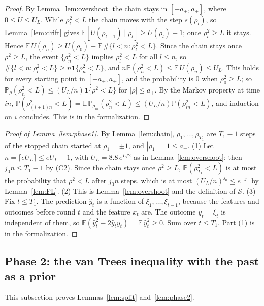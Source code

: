 \documentclass[12pt]{amsart}
\theoremstyle{definition}
\numberwithin{equation}{section}
\newcommand{\E}{\mathbb{E}}
\newcommand{\Prob}{\mathbb{P}}
\newcommand{\yh}{\hat y}
\newcommand{\Succ}{\mathcal{S}}
\begin{document}
\begin{proof}
By Lemma~\ref{lem:overshoot} the chain stays in $[-a_+,a_+]$, where $0\le U\le U_L$. While $\rho_l^2<L$ the chain moves with the step $s(\rho_l)$, so Lemma~\ref{lem:drift} gives $\E[U(\rho_{l+1})\mid\rho_l]\ge U(\rho_l)+1$; once $\rho_l^2\ge L$ it stays. Hence $\E\,U(\rho_n)\ge U(\rho_0)+\E\,\#\{l<n:\rho_l^2<L\}$. Since the chain stays once $\rho^2\ge L$, the event $\{\rho_n^2<L\}$ implies $\rho_l^2<L$ for all $l\le n$, so $\#\{l<n:\rho_l^2<L\}\ge n\mathbf 1\{\rho_n^2<L\}$, and $n\Prob(\rho_n^2<L)\le\E\,U(\rho_n)\le U_L$. This holds for every starting point in $[-a_+,a_+]$, and the probability is $0$ when $\rho_0^2\ge L$; so $\Prob_\rho(\rho_n^2<L)\le(U_L/n)\mathbf 1\{\rho^2<L\}$ for $|\rho|\le a_+$. By the Markov property at time $in$, $\Prob(\rho_{(i+1)n}^2<L)=\E\,\Prob_{\rho_{in}}(\rho_n^2<L)\le(U_L/n)\Prob(\rho_{in}^2<L)$, and induction on $i$ concludes. This is  in the formalization.
\end{proof}

\begin{proof}[Proof of Lemma~\ref{lem:phase1}]
By Lemma~\ref{lem:chain}, $\rho_1,\dots,\rho_{T_1}$ are $T_1-1$ steps of the stopped chain started at $\rho_1=\pm1$, and $|\rho_1|=1\le a_+$. (1) Let $n=\lceil eU_L\rceil\le eU_L+1$, with $U_L=8.8\,e^{L/2}$ as in Lemma~\ref{lem:overshoot}; then $j_0n\le T_1-1$ by (C2). Since the chain stays once $\rho^2\ge L$, $\Prob(\rho_{T_1}^2<L)$ is at most the probability that $\rho^2<L$ after $j_0n$ steps, which is at most $(U_L/n)^{j_0}\le e^{-j_0}$ by Lemma~\ref{lem:FL}. (2) This is Lemma~\ref{lem:overshoot} and the definition of $\Succ$. (3) Fix $t\le T_1$. The prediction $\yh_t$ is a function of $\xi_1,\dots,\xi_{t-1}$, because the features and outcomes before round $t$ and the feature $x_t$ are. The outcome $y_t=\xi_t$ is independent of them, so $\E(\yh_t^2-2\yh_ty_t)=\E\,\yh_t^2\ge0$. Sum over $t\le T_1$. Part (1) is  in the formalization.
\end{proof}

\subsection{Phase 2: the van Trees inequality with the past as a prior}\label{subsec:phase2}
This subsection proves Lemmas~\ref{lem:split} and~\ref{lem:phase2}.
\end{document}
